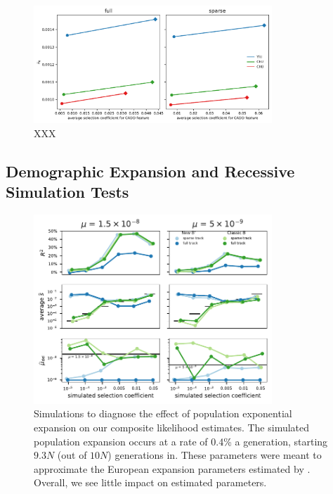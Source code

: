 \documentclass[11pt]{article}
\begin{document}
\begin{figure}[htbp]
    \label{suppfig:sel-ident}
  \centering
  \includegraphics[width=0.8\textwidth]{figures/supplementary/ave_sel_vs_pi0.pdf}
  \caption{XXX}
\end{figure}


\subsection{Demographic Expansion and Recessive Simulation Tests}
\label{supp:sim-assum}


\begin{figure}[htbp]
    \label{suppfig:sim-exp}
  \centering
  \includegraphics[width=0.8\textwidth]{figures/supplementary/subfigure_sim_mle_expansion.pdf}

  \caption{Simulations to diagnose the effect of population exponential
      expansion on our composite likelihood estimates. The simulated population
      expansion occurs at a rate of 0.4\% a generation, starting $9.3N$ (out of
      $10N$) generations in. These parameters were meant to approximate the
  European expansion parameters estimated by \textcite{Gutenkunst2009-pg}.
Overall, we see little impact on estimated parameters.}

\end{figure}
\end{document}
